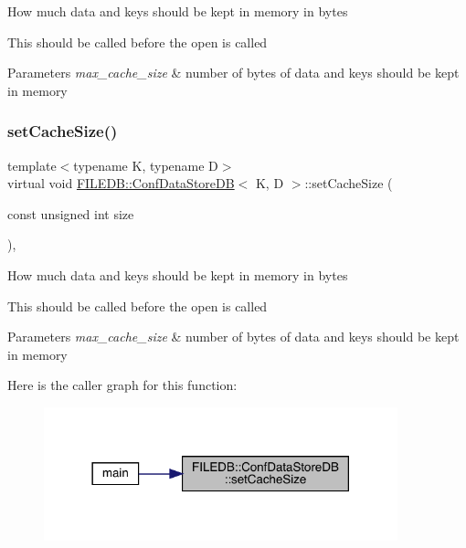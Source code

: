 How much data and keys should be kept in memory in bytes

This should be called before the open is called 
\begin{DoxyParams}{Parameters}
{\em max\+\_\+cache\+\_\+size} & number of bytes of data and keys should be kept in memory \\
\hline
\end{DoxyParams}
\mbox{\label{classFILEDB_1_1ConfDataStoreDB_af432d4a9c6dfb21a6ccb1969343cb4fa}} 
\subsubsection{\texorpdfstring{setCacheSize()}{setCacheSize()}\hspace{0.1cm}{\footnotesize\ttfamily [2/3]}}
{\footnotesize\ttfamily template$<$typename K, typename D$>$ \\
virtual void \mbox{\hyperlink{classFILEDB_1_1ConfDataStoreDB}{F\+I\+L\+E\+D\+B\+::\+Conf\+Data\+Store\+DB}}$<$ K, D $>$\+::set\+Cache\+Size (\begin{DoxyParamCaption}\item[{const unsigned int}]{size }\end{DoxyParamCaption})\hspace{0.3cm}{\ttfamily [inline]}, {\ttfamily [virtual]}}

How much data and keys should be kept in memory in bytes

This should be called before the open is called 
\begin{DoxyParams}{Parameters}
{\em max\+\_\+cache\+\_\+size} & number of bytes of data and keys should be kept in memory \\
\hline
\end{DoxyParams}
Here is the caller graph for this function\+:
\nopagebreak
\begin{figure}[H]
\begin{center}
\leavevmode
\includegraphics[width=290pt]{d8/d19/classFILEDB_1_1ConfDataStoreDB_af432d4a9c6dfb21a6ccb1969343cb4fa_icgraph}
\end{center}
\end{figure}
\mbox{\label{classFILEDB_1_1ConfDataStoreDB_af432d4a9c6dfb21a6ccb1969343cb4fa}} 
